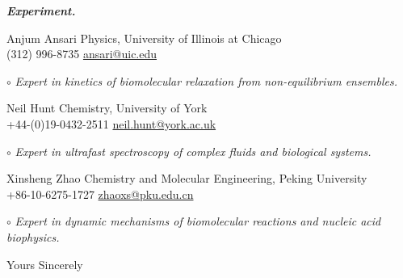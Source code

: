 \documentclass[11pt,a4paper]{letter} %
\begin{document}
\begin{letter}





\textbf{\textit{Experiment.}}

Anjum Ansari \hfill Physics, University of Illinois at Chicago\\
(312) 996-8735 \hfill \url{ansari@uic.edu}

$\circ$ \textit{Expert in kinetics of biomolecular relaxation from non-equilibrium ensembles.}

Neil Hunt \hfill Chemistry, University of York \\
+44-(0)19-0432-2511 \hfill \url{neil.hunt@york.ac.uk}

$\circ$ \textit{Expert in ultrafast spectroscopy of complex fluids and biological systems.}

Xinsheng Zhao \hfill Chemistry and Molecular Engineering, Peking University \\
+86-10-6275-1727 \hfill \url{zhaoxs@pku.edu.cn}

$\circ$ \textit{Expert in dynamic mechanisms of biomolecular reactions and nucleic acid biophysics.}


\closing{Yours Sincerely}

\end{letter}




%
%
\end{document}

